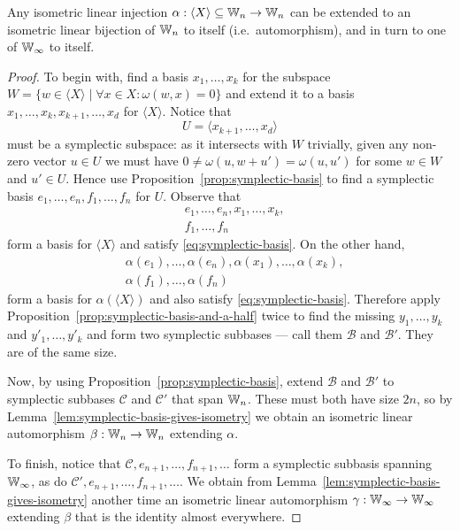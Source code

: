 \begin{proposition} \label{prop:symplectic-witt-extension}
    Any isometric linear injection $\alpha : \langle X \rangle \subseteq \mathbb{W}_n \to \mathbb{W}_n$ 
    can be extended to an isometric linear bijection of $\mathbb{W}_n$ to itself (i.e.~automorphism),
    and in turn to one of $\mathbb{W}_\infty$ to itself.
\end{proposition}

\begin{proof}
    To begin with, find a basis $x_1, \ldots, x_k$ for the subspace $W = \{ w \in \langle X \rangle \mid \forall x \in X : \omega(w, x) = 0 \}$ 
    and extend it to a basis \(
        x_1, \ldots, x_k, x_{k+1}, \ldots, x_d
    \) for $\langle X \rangle$.
    Notice that
    \[
        U = \langle x_{k+1}, \ldots, x_d \rangle
    \] must be a symplectic subspace:
    as it intersects with $W$ trivially, 
    given any non-zero vector $u \in U$ we must have $0 \neq \omega(u, w + u') = \omega(u, u')$ for some $w \in W$ and $u' \in U$.
    Hence use Proposition~\ref{prop:symplectic-basis} to find a symplectic basis
    \(
        e_1, \ldots, e_n,
        f_1, \ldots, f_n
    \)
    for $U$.
    Observe that 
    \begin{align*}
        &e_1, \ldots, e_n, x_1, \ldots, x_k, \\
        &f_1, \ldots, f_n
    \end{align*}
    form a basis for $\langle X \rangle$ and satisfy \eqref{eq:symplectic-basis}.
    On the other hand,
    \begin{align*}
        &\alpha(e_1), \ldots, \alpha(e_n), \alpha(x_1), \ldots, \alpha(x_k), \\
        &\alpha(f_1), \ldots, \alpha(f_n)
    \end{align*}
    form a basis for $\alpha(\langle X \rangle)$ and also satisfy \eqref{eq:symplectic-basis}.
    Therefore apply Proposition~\ref{prop:symplectic-basis-and-a-half} twice to find the missing 
    $y_1, \ldots, y_k$ and $y'_1, \ldots, y'_k$ and form two symplectic subbases --- call them $\mathcal{B}$ and $\mathcal{B}'$.
    They are of the same size.

    Now, by using Proposition~\ref{prop:symplectic-basis}, extend $\mathcal{B}$ and $\mathcal{B}'$ to symplectic subbases $\mathcal{C}$ and $\mathcal{C}'$ that span $\mathbb{W}_n$.
    These must both have size $2n$, 
    so by Lemma~\ref{lem:symplectic-basis-gives-isometry} we obtain an isometric linear automorphism $\beta : \mathbb{W}_n \to \mathbb{W}_n$ extending $\alpha$.

    To finish, notice that $\mathcal{C}, e_{n+1}, \ldots, f_{n+1}, \ldots$ form a symplectic subbasis spanning $\mathbb{W}_\infty$, as do $\mathcal{C}', e_{n+1}, \ldots, f_{n+1}, \ldots$.
    We obtain from Lemma~\ref{lem:symplectic-basis-gives-isometry} another time an isometric linear automorphism $\gamma : \mathbb{W}_\infty \to \mathbb{W}_\infty$ extending $\beta$ 
    that is the identity almost everywhere.
\end{proof}


